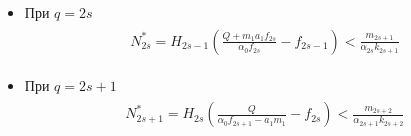\begin{itemize}
    \item При \(q = 2s \)
        \begin{align}
            \begin{split}
                N^*_{2s} = H_{2s-1} \left( \frac{Q + m_1 a_1 f_{2s}}{\alpha_0 f_{2s}} - f_{2s-1} \right) < \frac{m_{2s+1}}{\alpha_{2s} k_{2s+1}}
            \end{split}
        \end{align}
    \item При \( q = 2s+1 \)
        \begin{align}
            \begin{split}
                N^*_{2s+1} = H_{2s} \left( \frac{Q}{\alpha_0 f_{2s+1} - a_1 m_1} - f_{2s} \right) < \frac{m_{2s+2}}{\alpha_{2s+1} k_{2s+2}}
            \end{split}
        \end{align}
\end{itemize}